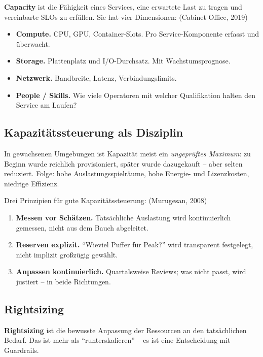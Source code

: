 \documentclass[11pt,a4paper,oneside]{article}
\newcommand{\fachbegriff}[1]{\textbf{#1}}
\newcommand{\quelle}[1]{{\footnotesize\color{lpGray}(#1)}}
\begin{document}
\fachbegriff{Capacity} ist die Fähigkeit eines Services, eine erwartete Last zu tragen und vereinbarte SLOs zu erfüllen. Sie hat vier Dimensionen: \quelle{Cabinet Office, 2019}

\begin{itemize}
  \item \textbf{Compute.} CPU, GPU, Container-Slots. Pro Service-Komponente erfasst und überwacht.
  \item \textbf{Storage.} Plattenplatz und I/O-Durchsatz. Mit Wachstumsprognose.
  \item \textbf{Netzwerk.} Bandbreite, Latenz, Verbindungslimits.
  \item \textbf{People / Skills.} Wie viele Operatoren mit welcher Qualifikation halten den Service am Laufen?
\end{itemize}

\subsection{Kapazitätssteuerung als Disziplin}

In gewachsenen Umgebungen ist Kapazität meist ein \emph{ungeprüftes Maximum}: zu Beginn wurde reichlich provisioniert, später wurde dazugekauft -- aber selten reduziert. Folge: hohe Auslastungsspielräume, hohe Energie- und Lizenzkosten, niedrige Effizienz.

Drei Prinzipien für gute Kapazitätssteuerung: \quelle{Murugesan, 2008}

\begin{enumerate}
  \item \textbf{Messen vor Schätzen.} Tatsächliche Auslastung wird kontinuierlich gemessen, nicht aus dem Bauch abgeleitet.
  \item \textbf{Reserven explizit.} ``Wieviel Puffer für Peak?'' wird transparent festgelegt, nicht implizit großzügig gewählt.
  \item \textbf{Anpassen kontinuierlich.} Quartalsweise Reviews; was nicht passt, wird justiert -- in beide Richtungen.
\end{enumerate}

\subsection{Rightsizing}

\fachbegriff{Rightsizing} ist die bewusste Anpassung der Ressourcen an den tatsächlichen Bedarf. Das ist mehr als ``runterskalieren'' -- es ist eine Entscheidung mit Guardrails.
\end{document}

